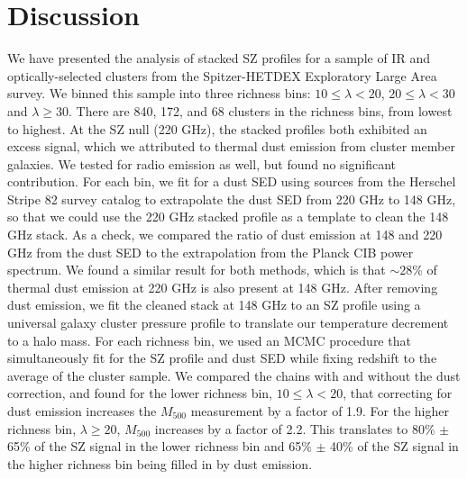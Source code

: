 \documentclass[a4paper,fleqn,usenatbib]{mnras}
\begin{document}
\section{Discussion} \label{sec:conclusions}
We have presented the analysis of stacked SZ profiles for a sample of IR and optically-selected clusters from the Spitzer-HETDEX Exploratory Large Area survey. We binned this sample into three richness bins: $10 \leq \lambda < 20$, $20 \leq \lambda < 30$ and $\lambda \geq 30$. There are 840, 172, and 68 clusters in the richness bins, from lowest to highest. 
At the SZ null (220 GHz), the stacked profiles both exhibited an excess signal, which we attributed to thermal dust emission from cluster member galaxies. We tested for radio emission as well, but found no significant contribution.  For each bin, we fit for a dust SED using sources from the Herschel Stripe 82 survey catalog to extrapolate the dust SED from 220 GHz to 148 GHz, so that we could use the 220 GHz stacked profile as a template to clean the 148 GHz stack. As a check, we compared the ratio of dust emission at 148 and 220 GHz from the dust SED to the extrapolation from the Planck CIB power spectrum. We found a similar result for both methods, which is that $\sim28\%$ of thermal dust emission at 220 GHz is also present at 148 GHz. 
After removing dust emission, we fit the cleaned stack at 148 GHz to an SZ profile using a universal galaxy cluster pressure profile to translate our temperature decrement to a halo mass. For each richness bin, we used an MCMC procedure that simultaneously fit for the SZ profile and dust SED while fixing redshift to the average of the cluster sample.  We compared the chains with and without the dust correction, and found for the lower richness bin, $10 \leq \lambda < 20$, that correcting for dust emission increases the $M_{500}$ measurement by a factor of 1.9. For the higher richness bin, $\lambda 
\geq 20$, $M_{500}$ increases by a factor of 2.2. This translates to 80\% $\pm$ 65\% of the SZ signal in the lower richness bin and 65\% $\pm$ 40\% of the SZ signal in the higher richness bin being filled in by dust emission. 
\end{document}
